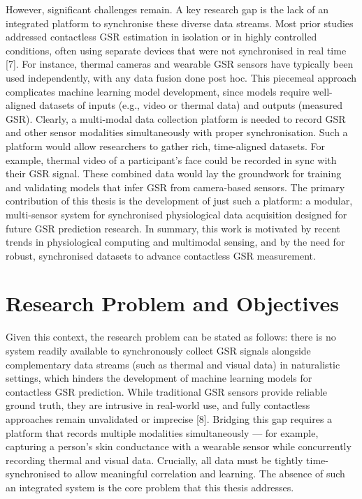 However, significant challenges remain. A key research gap is the lack of an integrated platform to synchronise these diverse data streams. Most prior studies addressed contactless GSR estimation in isolation or in highly controlled conditions, often using separate devices that were not synchronised in real time [7]. For instance, thermal cameras and wearable GSR sensors have typically been used independently, with any data fusion done post hoc. This piecemeal approach complicates machine learning model development, since models require well-aligned datasets of inputs (e.g., video or thermal data) and outputs (measured GSR). Clearly, a multi-modal data collection platform is needed to record GSR and other sensor modalities simultaneously with proper synchronisation. Such a platform would allow researchers to gather rich, time-aligned datasets. For example, thermal video of a participant's face could be recorded in sync with their GSR signal. These combined data would lay the groundwork for training and validating models that infer GSR from camera-based sensors. The primary contribution of this thesis is the development of just such a platform: a modular, multi-sensor system for synchronised physiological data acquisition designed for future GSR prediction research. In summary, this work is motivated by recent trends in physiological computing and multimodal sensing, and by the need for robust, synchronised datasets to advance contactless GSR measurement.

\section{Research Problem and Objectives}
Given this context, the research problem can be stated as follows: there is no system readily available to synchronously collect GSR signals alongside complementary data streams (such as thermal and visual data) in naturalistic settings, which hinders the development of machine learning models for contactless GSR prediction. While traditional GSR sensors provide reliable ground truth, they are intrusive in real-world use, and fully contactless approaches remain unvalidated or imprecise [8]. Bridging this gap requires a platform that records multiple modalities simultaneously --- for example, capturing a person's skin conductance with a wearable sensor while concurrently recording thermal and visual data. Crucially, all data must be tightly time-synchronised to allow meaningful correlation and learning. The absence of such an integrated system is the core problem that this thesis addresses.

